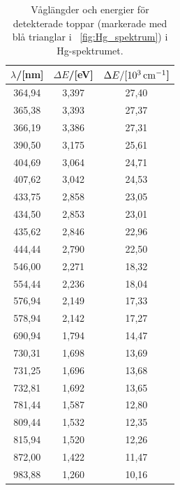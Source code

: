 \documentclass[11pt,a4paper]{article}
\newcommand{\figref}{\figurename~\ref}
\begin{document}
\begin{table}
\centering
\caption{Våglängder och energier för detekterade toppar (markerade med
  blå trianglar i \figref{fig:Hg_spektrum}) i Hg-spektrumet. } 
\label{tab:Hg_toppar}
\begin{tabular}{|c|c|c|}\hline
$\lambda$/[nm] & $\Delta E$/[eV]  &$\Delta E/[\unit[10^3]{cm^{-1}}$]
\\ \hline
364,94  	& 3,397 	& 27,40 \\ 
365,38  	& 3,393 	& 27,37 \\ 
366,19  	& 3,386 	& 27,31 \\ 
390,50  	& 3,175 	& 25,61 \\ 
404,69  	& 3,064 	& 24,71 \\ 
407,62  	& 3,042 	& 24,53 \\ 
433,75  	& 2,858 	& 23,05 \\ 
434,50  	& 2,853 	& 23,01 \\ 
435,62  	& 2,846 	& 22,96 \\ 
444,44  	& 2,790 	& 22,50 \\ 
546,00  	& 2,271 	& 18,32 \\ 
554,44  	& 2,236 	& 18,04 \\ 
576,94  	& 2,149 	& 17,33 \\ 
578,94  	& 2,142 	& 17,27 \\ 
690,94  	& 1,794 	& 14,47 \\ 
730,31  	& 1,698 	& 13,69 \\ 
731,25  	& 1,696 	& 13,68 \\ 
732,81  	& 1,692 	& 13,65 \\ 
781,44  	& 1,587 	& 12,80 \\ 
809,44  	& 1,532 	& 12,35 \\ 
815,94  	& 1,520 	& 12,26 \\ 
872,00  	& 1,422 	& 11,47 \\ 
983,88  	& 1,260 	& 10,16 \\ 
\hline
\end{tabular}
\end{table}
\end{document}
